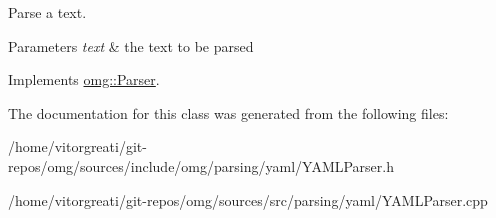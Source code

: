 Parse a text. 


\begin{DoxyParams}{Parameters}
{\em text} & the text to be parsed \\
\hline
\end{DoxyParams}


Implements \mbox{\hyperlink{classomg_1_1_parser_af47d9c929199cbf845d3150defc499f0}{omg\+::\+Parser}}.



The documentation for this class was generated from the following files\+:\begin{DoxyCompactItemize}
\item 
/home/vitorgreati/git-\/repos/omg/sources/include/omg/parsing/yaml/Y\+A\+M\+L\+Parser.\+h\item 
/home/vitorgreati/git-\/repos/omg/sources/src/parsing/yaml/Y\+A\+M\+L\+Parser.\+cpp\end{DoxyCompactItemize}
